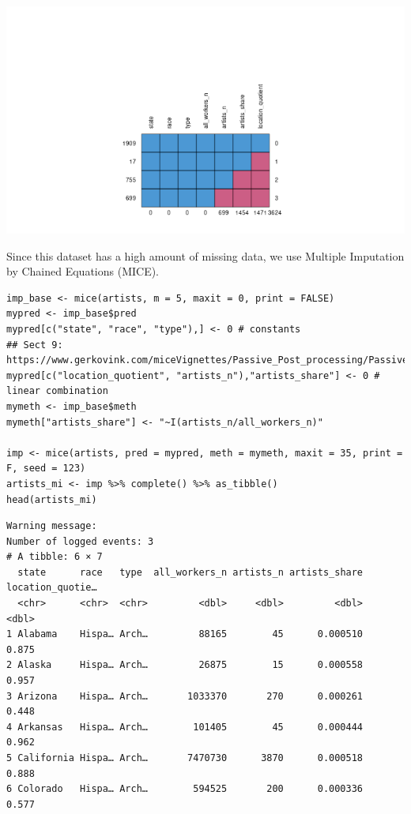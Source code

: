 \documentclass[8pt]{article}
\begin{document}
\begin{center}
\includegraphics[width=.9\linewidth]{media/mdpattern.png}
\end{center}

Since this dataset has a high amount of missing data, we use Multiple Imputation by Chained Equations (MICE).

\begin{verbatim}
imp_base <- mice(artists, m = 5, maxit = 0, print = FALSE)
mypred <- imp_base$pred
mypred[c("state", "race", "type"),] <- 0 # constants
## Sect 9: https://www.gerkovink.com/miceVignettes/Passive_Post_processing/Passive_imputation_post_processing.html
mypred[c("location_quotient", "artists_n"),"artists_share"] <- 0 # linear combination
mymeth <- imp_base$meth
mymeth["artists_share"] <- "~I(artists_n/all_workers_n)"

imp <- mice(artists, pred = mypred, meth = mymeth, maxit = 35, print = F, seed = 123)
artists_mi <- imp %>% complete() %>% as_tibble()
head(artists_mi)
\end{verbatim}

\begin{verbatim}
Warning message:
Number of logged events: 3
# A tibble: 6 × 7
  state      race   type  all_workers_n artists_n artists_share location_quotie…
  <chr>      <chr>  <chr>         <dbl>     <dbl>         <dbl>            <dbl>
1 Alabama    Hispa… Arch…         88165        45      0.000510            0.875
2 Alaska     Hispa… Arch…         26875        15      0.000558            0.957
3 Arizona    Hispa… Arch…       1033370       270      0.000261            0.448
4 Arkansas   Hispa… Arch…        101405        45      0.000444            0.962
5 California Hispa… Arch…       7470730      3870      0.000518            0.888
6 Colorado   Hispa… Arch…        594525       200      0.000336            0.577
\end{verbatim}
\begin{latex}
\pagebreak
\end{latex}
\end{document}
